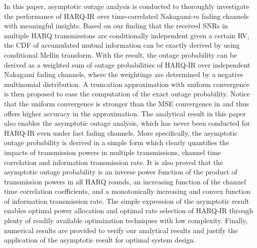 \documentclass[12pt,onecolumn,draftcls]{IEEEtran}
\begin{document}
In this paper, asymptotic outage analysis is conducted to thoroughly investigate the performance of HARQ-IR over time-correlated Nakagami-$m$ fading channels with meaningful insights. Based on our finding that the received SNRs in multiple HARQ transmissions are conditionally independent given a certain RV, the CDF of accumulated mutual information can be exactly derived by using conditional Mellin transform. With the result, the outage probability can be derived as a weighted sum of outage probabilities of HARQ-IR over independent Nakagami fading channels, where the weightings are determined by a negative multinomial distribution. A truncation approximation with uniform convergence is then proposed to ease the computation of the exact outage probability. Notice that the uniform convergence is stronger than the MSE convergence in \cite{shi2015analysis,shi2016inverse} and thus offers higher accuracy in the approximation. The analytical result in this paper also enables the asymptotic outage analysis, which has never been conducted for HARQ-IR even under fast fading channels. More specifically, the asymptotic outage probability is derived in a simple form which clearly quantifies the impacts of transmission powers in multiple transmissions, channel time correlation and information transmission rate. It is also proved that the asymptotic outage probability is an inverse power function of the product of transmission powers in all HARQ rounds, an increasing function of the channel time correlation coefficients, and a monotonically increasing and convex function of information transmission rate. The simple expression of the asymptotic result enables optimal power allocation and optimal rate selection of HARQ-IR through plenty of readily available optimization techniques with low complexity. Finally, numerical results are provided to verify our analytical results and justify the application of the asymptotic result for optimal system design.


\end{document}
